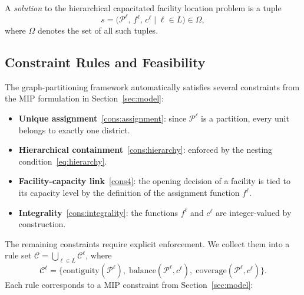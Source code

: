\documentclass[11pt]{article}
\theoremstyle{definition}
\begin{document}
A \emph{solution} to the hierarchical capacitated facility location problem is a tuple
%
\begin{equation}\label{eq:solution}
    s = \bigl(\mathcal{P}^\ell,\, f^\ell,\, c^\ell
    \;\big|\; \ell \in L\bigr) \in \Omega,
\end{equation}
%
where $\Omega$ denotes the set of all such tuples.




\subsection{Constraint Rules and Feasibility}
\label{sec:rules}

The graph-partitioning framework automatically satisfies several constraints
from the MIP formulation in Section~\ref{sec:model}:
\medskip
%
\begin{itemize}[nosep]
  \item \textbf{Unique assignment}~\eqref{cons:assignment}: since
    $\mathcal{P}^\ell$ is a partition, every unit belongs to exactly one
    district.
  \item \textbf{Hierarchical containment}~\eqref{cons:hierarchy}: enforced by
    the nesting condition~\eqref{eq:hierarchy}.
  \item \textbf{Facility-capacity link}~\eqref{cons4}: the opening decision of a facility is tied to its capacity level by the definition of the assignment function $f^{\ell}$.
  \item \textbf{Integrality}~\eqref{cons:integrality}: the functions $f^\ell$
    and $c^\ell$ are integer-valued by construction.
\end{itemize}
\medskip
The remaining constraints require explicit enforcement. We collect them into a
rule set $\mathcal{C} = \bigcup_{\ell \in L} \mathcal{C}^\ell$, where
%
\begin{equation}\label{eq:rules}
    \mathcal{C}^\ell = \bigl\{
        \mathrm{contiguity}(\mathcal{P}^\ell),\;
        \mathrm{balance}(\mathcal{P}^\ell, c^\ell),\;
        \mathrm{coverage}(\mathcal{P}^\ell, c^\ell)
    \bigr\}.
\end{equation}
%
Each rule corresponds to a MIP constraint from Section~\ref{sec:model}:
\end{document}
